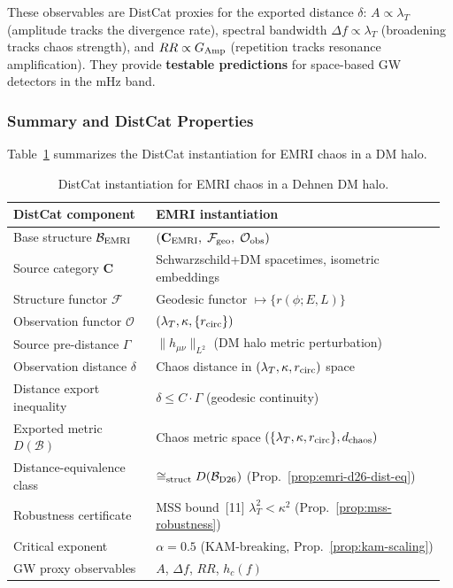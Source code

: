 \documentclass[
]{article}
\begin{document}
These observables are DistCat proxies for the exported distance $\delta$: $A \propto \lambda_T$ (amplitude tracks the divergence rate), spectral bandwidth $\Delta f \propto \lambda_T$ (broadening tracks chaos strength), and $RR \propto G_{\rm Amp}$ (repetition tracks resonance amplification). They provide \textbf{testable predictions} for space-based GW detectors in the mHz band.

\subsubsection{Summary and DistCat Properties}\label{subsec:emri-summary}

Table~\ref{tab:emri-distcat} summarizes the DistCat instantiation for EMRI chaos in a DM halo.

\begin{table}[t]
\centering
\begin{tabular}{@{} >{\raggedright\arraybackslash}p{0.32\linewidth} >{\raggedright\arraybackslash}p{0.65\linewidth}@{}}
\toprule
\textbf{DistCat component} & \textbf{EMRI instantiation} \\
\midrule
Base structure $\mathcal{B}_{\rm EMRI}$ & $(\mathbf{C}_{\rm EMRI},\; \mathcal{F}_{\rm geo},\; \mathcal{O}_{\rm obs})$ \\
Source category $\mathbf{C}$ & Schwarzschild+DM spacetimes, isometric embeddings \\
Structure functor $\mathcal{F}$ & Geodesic functor $\mapsto \{r(\phi; E,L)\}$ \\
Observation functor $\mathcal{O}$ & $(\lambda_T, \kappa, \{r_{\rm circ}\})$ \\
Source pre-distance $\Gamma$ & $\|h_{\mu\nu}\|_{L^2}$ (DM halo metric perturbation) \\
Observation distance $\delta$ & Chaos distance in $(\lambda_T, \kappa, r_{\rm circ})$ space \\
Distance export inequality & $\delta \leq C \cdot \Gamma$ (geodesic continuity) \\
Exported metric $D(\mathcal{B})$ & Chaos metric space $(\{\lambda_T, \kappa, r_{\rm circ}\}, d_{\rm chaos})$ \\
Distance-equivalence class & $\cong_{\rm struct} D(\mathcal{B}_{\rm D26})$ (Prop.~\ref{prop:emri-d26-dist-eq}) \\
Robustness certificate & MSS bound~[11] $\lambda_T^2 < \kappa^2$ (Prop.~\ref{prop:mss-robustness}) \\
Critical exponent & $\alpha = 0.5$ (KAM-breaking, Prop.~\ref{prop:kam-scaling}) \\
GW proxy observables & $A$, $\Delta f$, $RR$, $h_c(f)$ \\
\bottomrule
\end{tabular}
\caption{DistCat instantiation for EMRI chaos in a Dehnen DM halo.}
\label{tab:emri-distcat}
\end{table}
\end{document}
